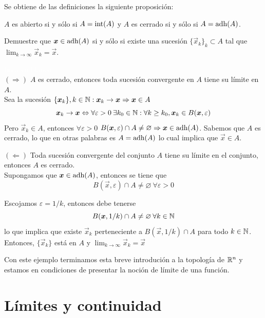 Se obtiene de las definiciones la siguiente proposici\'on:

\begin{proposicion}
$A$ es abierto si y s\'olo si $A=\text{int}({A})$ y $A$ es cerrado si y s\'olo si $A=\text{adh}({A})$.
\end{proposicion}

\begin{ejemplo} 
Demuestre que $\boldsymbol{x}\in \text{adh}({A})$ si y s\'olo si existe una sucesi\'on
$\{\vec{x}_k\}_k\subset A$ tal que $\lim_{k\to\infty}\vec{x}_k=\vec{x}$.

\begin{solucion}\textcolor{white}{linea en blanco}
\\$(\Rightarrow)$ $A$ es cerrado, entonces toda sucesi\'on convergente en $A$ tiene su l\'imite en $A$.
\\Sea la sucesi\'on $\{\boldsymbol{x}_k \}, k \in \mathbb{N}:\boldsymbol{x}_k \rightarrow \boldsymbol{x} \Rightarrow \boldsymbol{x} \in A$
$$ \boldsymbol{x}_k \rightarrow \boldsymbol{x} \Leftrightarrow \forall \varepsilon > 0 \:\exists k_0 \in \mathbb{N} : \forall k \geq k_0 , \boldsymbol{x}_k \in B(\boldsymbol{x},\varepsilon)$$
Pero $\vec{x}_k \in A$, entonces $\forall \varepsilon > 0$ $B(\boldsymbol{x},\varepsilon)\cap A \neq \varnothing \Rightarrow \boldsymbol{x} \in \text{adh}({A})$. Sabemos que $A$ es cerrado, lo que en otras palabras es $A=\text{adh}({A})$ lo cual implica que $\vec{x}\in A$.  

\medskip

$(\Leftarrow)$ Toda sucesi\'on convergente del conjunto $A$ tiene su l\'imite en el conjunto, entonces $A$ es cerrado.
\\Supongamos que $\boldsymbol{x}\in \text{adh}({A})$, entonces se tiene que 
$$B(\vec{x},\varepsilon)\cap A \neq \varnothing \: \forall \varepsilon > 0$$

Escojamos $\varepsilon = 1/k$, entonces debe tenerse 
$$B(\boldsymbol{x},1/k)\cap A \neq \varnothing \: \forall k\in \mathbb{N}$$ 
lo que implica que existe $\vec{x}_k$ perteneciente a $B(\vec{x},1/k)\cap A$ para todo $k\in \mathbb{N}$. Entonces, $\{\vec{x}_k\}$ est\'a en $A$ y $\lim_{k\to\infty}\vec{x}_k=\vec{x}$
\end{solucion}
\end{ejemplo}

Con este ejemplo terminamos esta breve introduci\'on a la
topolog\'ia de $\mathbb{R}^n$ y estamos en condiciones de presentar la noci\'on
de l\'imite de una funci\'on.

\section{L\'imites y continuidad}\label{limites}

